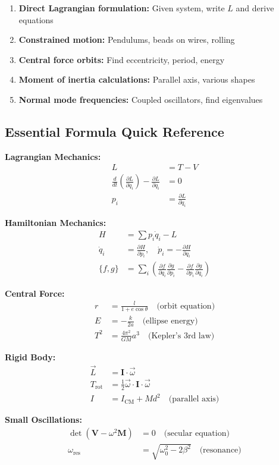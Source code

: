 \documentclass[12pt,a4paper]{article}
\theoremstyle{definition}
\begin{document}
\begin{enumerate}
    \item \textbf{Direct Lagrangian formulation:} Given system, write $L$ and derive equations
    \item \textbf{Constrained motion:} Pendulums, beads on wires, rolling
    \item \textbf{Central force orbits:} Find eccentricity, period, energy
    \item \textbf{Moment of inertia calculations:} Parallel axis, various shapes
    \item \textbf{Normal mode frequencies:} Coupled oscillators, find eigenvalues
\end{enumerate}

\subsection{Essential Formula Quick Reference}

\begin{importantbox}
\textbf{Lagrangian Mechanics:}
\begin{align*}
L &= T - V \\
\frac{d}{dt}\left(\frac{\partial L}{\partial \dot{q}_i}\right) - \frac{\partial L}{\partial q_i} &= 0 \\
p_i &= \frac{\partial L}{\partial \dot{q}_i}
\end{align*}

\textbf{Hamiltonian Mechanics:}
\begin{align*}
H &= \sum p_i\dot{q}_i - L \\
\dot{q}_i &= \frac{\partial H}{\partial p_i}, \quad \dot{p}_i = -\frac{\partial H}{\partial q_i} \\
\{f,g\} &= \sum_i\left(\frac{\partial f}{\partial q_i}\frac{\partial g}{\partial p_i} - \frac{\partial f}{\partial p_i}\frac{\partial g}{\partial q_i}\right)
\end{align*}

\textbf{Central Force:}
\begin{align*}
r &= \frac{l}{1 + e\cos\theta} \quad \text{(orbit equation)} \\
E &= -\frac{k}{2a} \quad \text{(ellipse energy)} \\
T^2 &= \frac{4\pi^2}{GM}a^3 \quad \text{(Kepler's 3rd law)}
\end{align*}

\textbf{Rigid Body:}
\begin{align*}
\vec{L} &= \mathbf{I} \cdot \vec{\omega} \\
T_{\text{rot}} &= \frac{1}{2}\vec{\omega} \cdot \mathbf{I} \cdot \vec{\omega} \\
I &= I_{\text{CM}} + Md^2 \quad \text{(parallel axis)}
\end{align*}

\textbf{Small Oscillations:}
\begin{align*}
\det(\mathbf{V} - \omega^2\mathbf{M}) &= 0 \quad \text{(secular equation)} \\
\omega_{\text{res}} &= \sqrt{\omega_0^2 - 2\beta^2} \quad \text{(resonance)}
\end{align*}
\end{importantbox}
\end{document}
